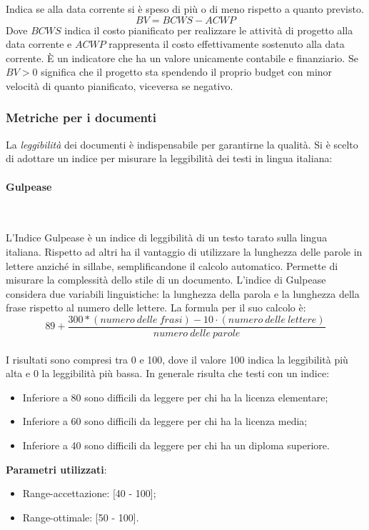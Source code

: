 			Indica se alla data corrente si è speso di più o di meno rispetto a quanto previsto.
			\[
			BV = BCWS - ACWP
			\]
			Dove $BCWS$ indica il costo pianificato per realizzare le attività di  progetto alla  data corrente e $ACWP$ rappresenta il costo effettivamente sostenuto alla data  corrente.
			È un indicatore che ha un valore unicamente contabile e finanziario. Se $BV>0$ significa che il progetto sta spendendo il proprio budget con minor velocità di quanto pianificato, viceversa se negativo. 

			
		\subsubsection{Metriche per i documenti}
		\label{metrichedocumenti}
		
		La \emph{leggibilità} dei documenti è indispensabile per garantirne la qualità. Si è scelto di adottare un indice per misurare la leggibilità dei testi in lingua italiana:
			
			\paragraph{Gulpease}\mbox{} \\
			\label{gulpease}
			
			L'Indice Gulpease è un indice di leggibilità di un testo tarato sulla lingua italiana. Rispetto ad altri ha il vantaggio di utilizzare la lunghezza delle parole in lettere anziché in sillabe, semplificandone il calcolo automatico. Permette di misurare la complessità dello stile di un documento.
			L'indice di Gulpease considera due variabili linguistiche: la lunghezza della parola e la lunghezza della frase rispetto al numero delle lettere.
			La formula per il suo calcolo è: \\
			$$
			89 + \frac{300 * (numero\ delle\ frasi) - 10 \cdot (numero\ delle\ lettere)}{numero\ delle\ parole}
			$$ \\
			I risultati sono compresi tra 0 e 100, dove il valore 100 indica la leggibilità più alta e 0 la leggibilità più bassa. In generale risulta che testi con un indice:
			\begin{itemize}
				\item Inferiore a 80 sono difficili da leggere per chi ha la licenza elementare;
				\item Inferiore a 60 sono difficili da leggere per chi ha la licenza media;
				\item Inferiore a 40 sono difficili da leggere per chi ha un diploma superiore.
			\end{itemize}
			\textbf{Parametri utilizzati}:
			\begin{itemize}
				\item Range-accettazione: [40 - 100];
				\item Range-ottimale: [50 - 100].
			\end{itemize}
			

